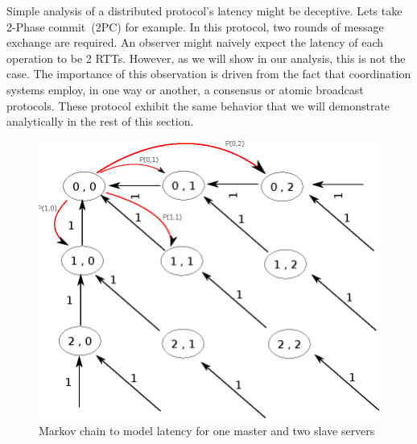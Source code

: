 Simple analysis of a distributed protocol's latency might be deceptive. Lets take 2-Phase commit~(2PC) for example. In this protocol, two rounds of message exchange are required. An observer might naively expect the latency of each operation to be 2 RTTs. However, as we will show in our analysis, this is not the case. The importance of this observation is driven from the fact that coordination systems employ, in one way or another, a consensus or atomic broadcast protocols. These protocol exhibit the same behavior that we will demonstrate analytically in the rest of this section.

\begin{figure}[h]
\centering
\includegraphics[scale=0.8]{img/markov_general.eps}
\caption{Markov chain to model latency for one master and two slave servers}
\label{fig:markovgeneral}
\end{figure}

